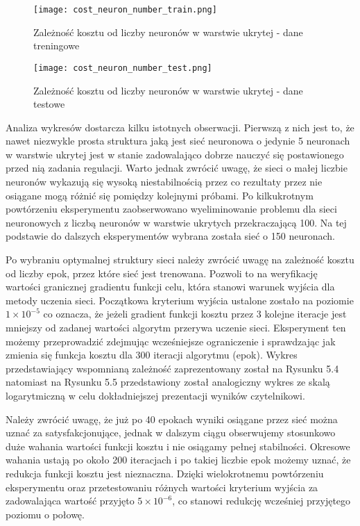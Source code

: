 \begin{figure}[!htb]
  \label{fig:Koszt-liczba-neuronow-treningowe}
  \centering \texttt{[image: cost\_neuron\_number\_train.png]}
  \caption{Zależność kosztu od liczby neuronów w warstwie ukrytej - dane treningowe}
\end{figure}

\begin{figure}[!htb]
  \label{fig:Koszt-liczba-neuronow-testowe}
  \centering \texttt{[image: cost\_neuron\_number\_test.png]}
  \caption{Zależność kosztu od liczby neuronów w warstwie ukrytej - dane testowe}
\end{figure}

\par Analiza wykresów dostarcza kilku istotnych obserwacji. Pierwszą z nich jest to, że nawet niezwykle prosta struktura jaką jest sieć neuronowa o jedynie 5 neuronach w warstwie ukrytej jest w stanie zadowalająco dobrze nauczyć się postawionego przed nią zadania regulacji. Warto jednak zwrócić uwagę, że sieci o małej liczbie neuronów wykazują się wysoką niestabilnością przez co rezultaty przez nie osiągane mogą różnić się pomiędzy kolejnymi próbami. Po kilkukrotnym powtórzeniu eksperymentu zaobserwowano wyeliminowanie problemu dla sieci neuronowych z liczbą neuronów w warstwie ukrytych przekraczającą 100. Na tej podstawie do dalszych eksperymentów wybrana została sieć o 150 neuronach. 
\par Po wybraniu optymalnej struktury sieci należy zwrócić uwagę na zależność kosztu od liczby epok, przez które sieć jest trenowana. Pozwoli to na weryfikację wartości granicznej gradientu funkcji celu, która stanowi warunek wyjścia dla metody uczenia sieci. Początkowa kryterium wyjścia ustalone zostało na poziomie \( 1\times10^{-5} \) co oznacza, że jeżeli gradient funkcji kosztu przez 3 kolejne iteracje jest mniejszy od zadanej wartości algorytm przerywa uczenie sieci. Eksperyment ten możemy przeprowadzić zdejmując wcześniejsze ograniczenie i sprawdzając jak zmienia się funkcja kosztu dla 300 iteracji algorytmu (epok). Wykres przedstawiający wspomnianą zależność zaprezentowany został na Rysunku 5.4 natomiast na Rysunku 5.5 przedstawiony został analogiczny wykres ze skalą logarytmiczną w celu dokładniejszej prezentacji wyników czytelnikowi.
\par Należy zwrócić uwagę, że już po 40 epokach wyniki osiągane przez sieć można uznać za satysfakcjonujące, jednak w dalszym ciągu obserwujemy stosunkowo duże wahania wartości funkcji kosztu i nie osiągamy pełnej stabilności. Okresowe wahania ustają po około 200 iteracjach i po takiej liczbie epok możemy uznać, że redukcja funkcji kosztu jest nieznaczna. Dzięki wielokrotnemu  powtórzeniu eksperymentu oraz przetestowaniu różnych wartości kryterium wyjścia za zadowalająca wartość przyjęto \( 5\times10^{-6} \), co stanowi redukcję wcześniej przyjętego poziomu o połowę.

